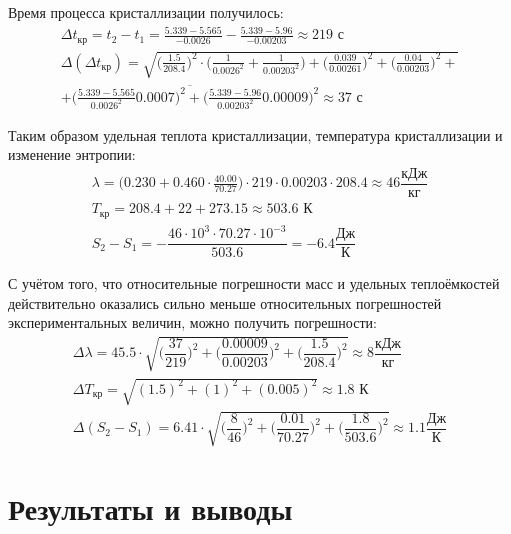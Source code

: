 \documentclass{article}
\begin{document}
Время процесса кристаллизации получилось:
\begin{gather*}
    \Delta t_{ \text{кр}} = t_2 - t_1 = \frac{ 5.339-5.565}{ -0.0026} - 
        \frac{ 5.339-5.96}{ -0.00203} \approx 219 \text{ с}\\
    \Delta (\Delta t_{ \text{кр}}) 
        =\sqrt{
            \bigg( \frac{ 1.5}{ 208.4} \bigg)^2\cdot\bigg( \frac{ 1}{ 0.0026^2} + \frac{ 1}{ 0.00203^2}\bigg)+
            \bigg( \frac{  0.039}{ 0.00261} \bigg)^2 +
            \bigg( \frac{ 0.04}{ 0.00203} \bigg)^2 +} \\
         \overline{+  
        \bigg( \frac{ 5.339-5.565}{ 0.0026^2} 0.0007 \bigg)^2 +
        \bigg( \frac{ 5.339-5.96}{ 0.00203^2} 0.00009 \bigg)^2}\approx37\text{ с}
\end{gather*}
    
Таким образом удельная теплота кристаллизации, температура кристаллизации и изменение энтропии:
\begin{gather*}
    \lambda = \bigg( 0.230 + 0.460 \cdot \frac{ 40.00}{ 70.27} \bigg)
        \cdot 219 \cdot 0.00203\cdot208.4\approx46 \dfrac{\text{кДж}}{\text{кг}}\\
    T_{ \text{кр}} = 208.4 + 22 + 273.15 \approx 503.6 \text{ К}\\
    S_2-S_1=- \dfrac{46\cdot10^{3} \cdot70.27\cdot10^{-3}}{503.6}=-6.4\dfrac{\text{Дж}}{\text{К}}
\end{gather*}

С учётом того, что относительные погрешности масс и удельных теплоёмкостей действительно оказались сильно меньше относительных погрешностей экспериментальных величин, можно получить погрешности: 
\begin{gather*}
    \Delta \lambda = 45.5\cdot\sqrt{
        \bigg(\dfrac{37}{219}\bigg)^2 + 
        \bigg(\dfrac{0.00009}{0.00203}\bigg)^2 +
        \bigg(\dfrac{1.5}{208.4}\bigg)^2}\approx8 \dfrac{\text{кДж}}{\text{кг}}\\
    \Delta T_{ \text{кр}}=\sqrt{(1.5)^2+(1)^2 + (0.005)^2}\approx1.8\text{ К}\\
    \Delta (S_2 - S_1) = 6.41\cdot\sqrt{
        \bigg(\dfrac{8}{46}\bigg)^2+
        \bigg(\dfrac{0.01}{70 .27}\bigg)^2+
        \bigg(\dfrac{1.8}{503.6}\bigg)^2}\approx1.1\dfrac{\text{Дж}}{\text{К}}
\end{gather*}

\section{Результаты и выводы}
\end{document}
